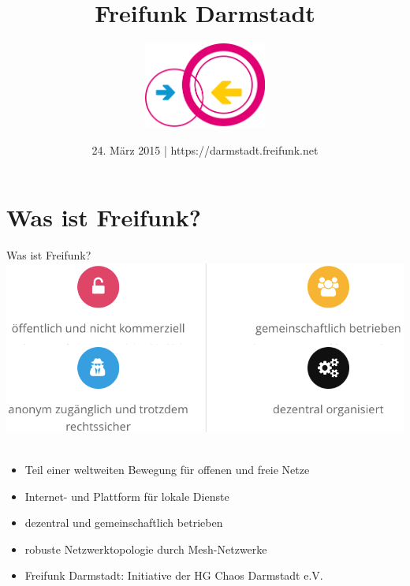 \documentclass{beamer}
\title{Freifunk Darmstadt}
\author{\includegraphics[width=4cm]{images/logo}}
\date{24. März 2015 | https://darmstadt.freifunk.net}
\begin{document}
\begin{frame}
\maketitle
\end{frame}



\section{Was ist Freifunk?}
\begin{frame}{Was ist Freifunk?}
\includegraphics[width=1.1\textheight]{images/principles}$\;$
\begin{itemize}
	\item Teil einer weltweiten Bewegung für offenen und freie Netze
	\item Internet- und Plattform für lokale Dienste
	\item dezentral und gemeinschaftlich betrieben
	\item robuste Netzwerktopologie durch Mesh-Netzwerke
	\item Freifunk Darmstadt: Initiative der HG Chaos Darmstadt e.V.
\end{itemize}
\end{frame}
\end{document}
